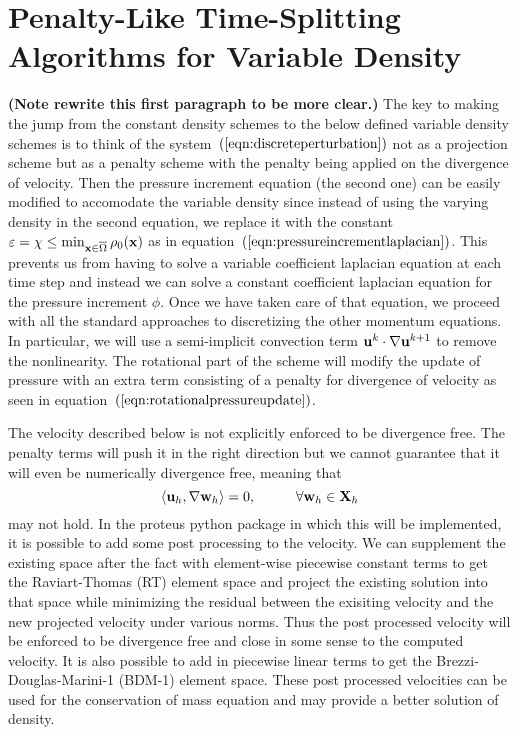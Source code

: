 \documentclass[letterpaper]{erdc}
\begin{document}
%
%
%
%
\chapter{Penalty-Like Time-Splitting Algorithms for Variable Density}
\textbf{(Note rewrite this first paragraph to be more clear.)} The key to making the jump from the constant density schemes to the below defined variable density schemes is to think of the system~$\left(\ref{eqn:discreteperturbation}\right)$ not as a projection scheme but as a penalty scheme with the penalty being applied on the divergence of velocity.  Then the pressure increment equation (the second one) can be easily modified to accomodate the variable density since instead of using the varying density in the second equation, we replace it with the constant $\varepsilon = \chi \leq \min_{\textbf{x}\in\overline{\Omega}}\rho_0(\textbf{x})$ as in equation~$\left(\ref{eqn:pressureincrementlaplacian}\right)$.  This prevents us from having to solve a variable coefficient laplacian equation at each time step and instead we can solve a constant coefficient laplacian equation for the pressure increment $\phi$.  Once we have taken care of that equation, we proceed with all the standard approaches to discretizing the other momentum equations.  In particular, we will use a semi-implicit convection term $\textbf{u}^{k}\cdot\nabla\textbf{u}^{k+1}$ to remove the nonlinearity.  The rotational part of the scheme will modify the update of pressure with an extra term consisting of a penalty for divergence of velocity as seen in equation~$\left(\ref{eqn:rotationalpressureupdate}\right)$.  

The velocity described below is not explicitly enforced to be divergence free.  The penalty terms will push it in the right direction but we cannot guarantee that it will even be numerically divergence free, meaning that 
\begin{equation}
  \left\langle \textbf{u}_h, \nabla\textbf{w}_h \right\rangle = 0, \hspace{1cm}\forall\textbf{w}_h\in\textbf{X}_h
\end{equation}
may not hold.  In the proteus python package in which this will be implemented, it is possible to add some post processing to the velocity.  We can supplement the existing space after the fact with element-wise piecewise constant terms to get the Raviart-Thomas (RT) element space and project the existing solution into that space while minimizing the residual between the exisiting velocity and the new projected velocity under various norms.    Thus the post processed velocity will be enforced to be divergence free and close in some sense to the computed velocity.  It is also possible to add in piecewise linear terms to get the Brezzi-Douglas-Marini-1 (BDM-1) element space.  These post processed velocities can be used for the conservation of mass equation and may provide a better solution of density.
\end{document}
